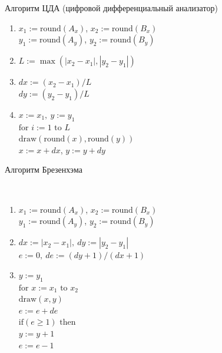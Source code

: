 \documentclass[10pt]{beamer}
\begin{document}
	
	
	
	
	\begin{frame}{Алгоритм ЦДА (цифровой дифференциальный анализатор)}
		{
		}
		{
			\small
			\begin{enumerate}
				\item<+-> $x_1:=\text{round}(A_x)$, $x_2:=\text{round}(B_x)$\\				
					  $y_1:=\text{round}(A_y)$, $y_2:=\text{round}(B_y)$\\
					  
					  
				\item<+-> $L:=\max(|x_2-x_1|,|y_2-y_1|)$
				
				\item<+-> $dx:=(x_2-x_1)/L$\\
				      $dy:=(y_2-y_1)/L$
				      
				\item <+->	$x:=x_1,\ y:=y_1$\\						
						$\text{for }i:=1 \text{ to } L$\\
						\quad $\text{draw}(\text{round}(x),\text{round}(y))$\\
						\quad $x:=x+dx$, $y:=y+dy$ \\
						
			\end{enumerate}
		}
	\end{frame}
	
	\begin{frame}{Алгоритм Брезенхэма}
		{
		}
		{
			\small
			\begin{center}
			\end{center} ~\\[-3em]
			
			\begin{enumerate}
				\item<+-> 	$x_1:=\text{round}(A_x)$, $x_2:=\text{round}(B_x)$\\				
						$y_1:=\text{round}(A_y)$, $y_2:=\text{round}(B_y)$\\
						
				\item<+->  	$dx:=|x_2-x_1|, \ dy:=|y_2-y_1|$\\	
						$e:=0, \ de:=(dy+1)/(dx+1) $
						
						
				\item<+->  	$y:=y_1$\\
						$\text{for }x:=x_1\text{ to }x_2$\\
						\quad$\text{draw}(x,y)$\\
						\quad$e:=e+de$\\
						\quad $\text{if}(e \geq 1)\text{ then}$\\
						\quad\quad$y:=y+1$\\
						\quad\quad$e:=e-1$ 
			\end{enumerate}
		}
	\end{frame}
	
\end{document}
